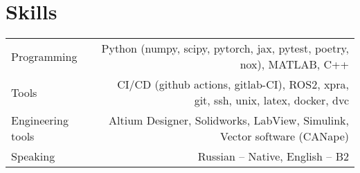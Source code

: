 \section*{\sectionformat Skills}
\begin{tabular}{@{}L!{\VRule}R}
    Programming       & Python (numpy, scipy, pytorch, jax, pytest, poetry, nox), MATLAB, C++             \\
    Tools             & CI/CD (github actions, gitlab-CI), ROS2, xpra, git, ssh, unix, latex, docker, dvc \\
    Engineering tools & Altium Designer, Solidworks, LabView, Simulink, Vector software (CANape)          \\
    Speaking          & Russian -- Native, English -- B2                                                  \\
\end{tabular}